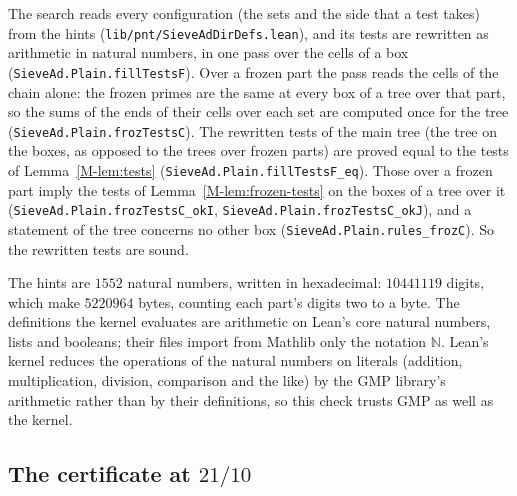 \documentclass[11pt]{article}
\newcommand{\lean}[1]{\texttt{#1}}
\newcommand{\file}[1]{\nolinkurl{#1}}
\numberwithin{equation}{section}
\begin{document}
The search reads every
configuration (the sets and the side that a test takes) from the hints (\file{lib/pnt/SieveAdDirDefs.lean}), and its
tests are rewritten as arithmetic in natural numbers, in one pass over the cells of a box
(\lean{SieveAd.Plain.fillTestsF}). Over a frozen part the pass reads the cells of the chain alone: the frozen primes are
the same at every box of a tree over that part, so the sums of the ends of their cells over each set are computed once
for the tree (\lean{SieveAd.Plain.frozTestsC}). The rewritten tests of the main tree (the tree on the boxes, as opposed
to the trees over frozen parts) are proved equal to the tests of Lemma~\ref{M-lem:tests}
(\lean{SieveAd.Plain.fillTestsF\_eq}). Those over a frozen part imply the tests of Lemma~\ref{M-lem:frozen-tests} on the
boxes of a tree over it (\lean{SieveAd.Plain.frozTestsC\_okI}, \lean{SieveAd.Plain.frozTestsC\_okJ}), and a statement of
the tree concerns no other box (\lean{SieveAd.Plain.\allowbreak rules\_frozC}). So the rewritten tests are sound.

The hints are $1552$ natural numbers, written in hexadecimal: $10441119$ digits, which make $5220964$
bytes, counting each part's digits two to a byte.
The definitions the kernel evaluates are arithmetic on Lean's core natural numbers, lists and booleans; their files
import from Mathlib only the notation $\mathbb N$. Lean's kernel reduces the operations of the natural numbers on
literals (addition, multiplication, division, comparison and the like) by the GMP library's arithmetic rather than by
their definitions, so this check trusts GMP as well as the kernel.

\subsection*{The certificate at $21/10$}
\end{document}
